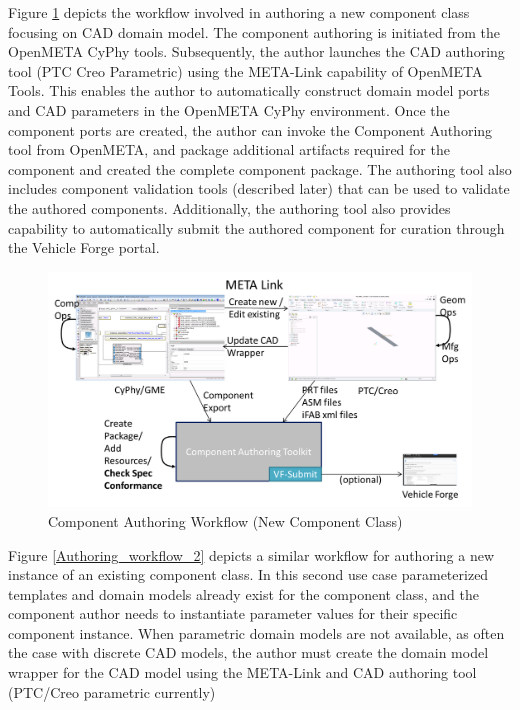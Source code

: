 Figure \ref{Authoring_workflow_1} depicts the workflow involved in authoring a new component class focusing on CAD domain model. The component authoring is initiated from the OpenMETA CyPhy tools. Subsequently, the author launches the CAD authoring tool (PTC Creo Parametric) using the META-Link capability of OpenMETA Tools. This enables the author to automatically construct domain model ports and CAD parameters in the OpenMETA CyPhy environment. Once the component ports are created, the author can invoke the Component Authoring tool from OpenMETA, and package additional artifacts required for the component and created the complete component package. The authoring tool also includes component validation tools (described later) that can be used to validate the authored components. Additionally, the authoring tool also provides capability to automatically submit the authored component for curation through the Vehicle Forge portal. 

\begin{figure}
\includegraphics*[width=\textwidth]{Authoring_workflow_1}
\caption{Component Authoring Workflow (New Component Class)}
\label{Authoring_workflow_1}
\end{figure} 

Figure \ref{Authoring_workflow_2} depicts a similar workflow for authoring a new instance of an existing component class. In this second use case parameterized templates and domain models already exist for the component class, and the component author needs to instantiate parameter values for their specific component instance. When parametric domain models are not available, as often the case with discrete CAD models, the author must create the domain model wrapper for the CAD model using the META-Link and CAD authoring tool (PTC/Creo parametric currently)


